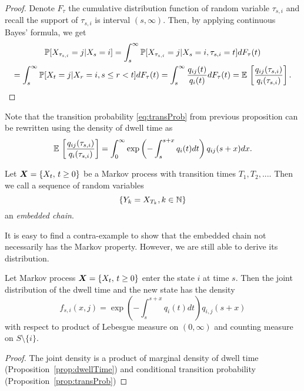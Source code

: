 {\begin{proof}
	Denote $F_{\tau}$ the cumulative distribution function of random variable $\tau_{s,i}$ and recall the support of $\tau_{s,i}$ is interval $(s, \infty)$. Then, by applying continuous Bayes' formula, we get
	\begin{multline*}
		\operatorname{\mathbb{P}} [X_{\tau_{s,i}} = j \vert X_s = i ] 
		= \int_s^\infty \operatorname{\mathbb{P}} [X_{\tau_{s,i}} = j \vert X_s = i, \tau_{s,i} = t] dF_{\tau} (t) \\
		= \int_s^\infty \operatorname{\mathbb{P}} [X_{t} = j \vert X_r = i, s \leq r < t] dF_{\tau} (t)
		= \int_s^\infty \frac{q_{ij}(t)}{q_{i}(t)} dF_{\tau} (t)
		= \operatorname{\mathbb{E}\,} \left[ \frac{q_{ij}(\tau_{s,i})}{q_i(\tau_{s,i})} \right].
	\end{multline*}
\end{proof}

Note that the transition probability \eqref{eq:transProb} from previous proposition can be rewritten using the density of dwell time as
\[
	\operatorname{\mathbb{E}\,} \left[ \frac{q_{ij}(\tau_{s,i})}{q_i(\tau_{s,i})} \right] =
	\int_0^\infty \exp \left(- \int_{s}^{s+x} q_i(t) dt \right) q_{ij}(s+x) dx.
\]

\begin{definition}
	\label{def:embedded}
	Let $\bm{X} = \{ X_t ,\, t \geq 0 \}$ be a Markov process with transition times $T_1, T_2, ...$. Then we call a sequence of random variables
	\[
		\{ Y_k = X_{T_k}, k \in \mathbb{N} \}
	\]
	an \emph{embedded chain}.
\end{definition}

It is easy to find a contra-example to show that the embedded chain not necessarily has the Markov property. However, we are still able to derive its distribution.

\begin{corollary}
	Let Markov process $\bm{X} = \{ X_t ,\, t \geq 0 \}$ enter the state $i$ at time $s$. Then the joint distribution of the dwell time and the new state has the density
	\[
		f_{s,i} (x, j) = \exp \left(- \int_{s}^{s+x} q_i(t) dt \right) q_{i,j}(s+x)
	\]
	with respect to product of Lebesgue measure on $(0, \infty)$ and counting measure on $S \setminus \{i\}$.
\end{corollary}

\begin{proof}
	The joint density is a product of marginal density of dwell time (Proposition~\ref{prop:dwellTime}) and conditional transition probability (Proposition~\ref{prop:transProb})
\end{proof}

	
	
	




}
